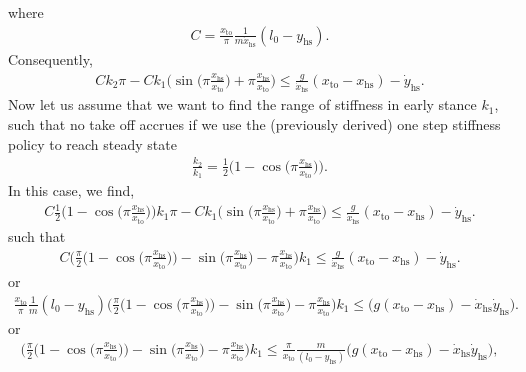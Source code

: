 \documentclass[journal,12pt,onecolumn]{IEEEtran}
\begin{document}
where
\begin{align}
	C =\frac{x_{\text{to}}}{\pi} \frac{1}{m \dot{x}_{\text{hs}}} (l_0-y_\text{hs}).
\end{align}
Consequently,
\begin{align}
	C k_2 \pi - C k_1 \Big( \sin \Big(\pi\frac{x_\text{hs}}{x_\text{to}} \Big) + \pi \frac{x_{\text{hs}}}{x_{\text{to}}} \Big) \leq \frac{g}{\dot{x}_{\text{hs}}} (x_{\text{to}}-x_{\text{hs}}) - \dot{y}_{\text{hs}}.
\end{align}
Now let us assume that we want to find the range of stiffness in early stance $k_1$, such that no take off accrues if we use the (previously derived) one step stiffness policy to reach steady state
\begin{align}
	\frac{k_2}{k_1}= \frac{1}{2} \Big(1-\cos\big(\pi \frac{x_{\text{hs}}}{x_{\text{to}}} \big)\Big).
\end{align}
In this case, we find,
\begin{align}
	C \frac{1}{2} \Big(1-\cos\big(\pi \frac{x_{\text{hs}}}{x_{\text{to}}} \big)\Big) k_1 \pi - C k_1 \Big( \sin \Big(\pi\frac{x_\text{hs}}{x_\text{to}} \Big) + \pi \frac{x_{\text{hs}}}{x_{\text{to}}} \Big) \leq \frac{g}{\dot{x}_{\text{hs}}} (x_{\text{to}}-x_{\text{hs}}) - \dot{y}_{\text{hs}}.
\end{align}
such that
\begin{align}
	C \Bigg(\frac{\pi}{2} \Big(1-\cos\Big(\pi \frac{x_{\text{hs}}}{x_{\text{to}}} \Big)\Big)  -  \sin \Big(\pi\frac{x_\text{hs}}{x_\text{to}} \Big) - \pi \frac{x_{\text{hs}}}{x_{\text{to}}} \Bigg) k_1 \leq \frac{g}{\dot{x}_{\text{hs}}} (x_{\text{to}}-x_{\text{hs}}) - \dot{y}_{\text{hs}}.
\end{align}
or
\begin{align}
	\frac{x_{\text{to}}}{\pi} \frac{1}{m} (l_0-y_\text{hs}) \Bigg(\frac{\pi}{2} \Big(1-\cos\Big(\pi \frac{x_{\text{hs}}}{x_{\text{to}}} \Big)\Big)  -  \sin \Big(\pi\frac{x_\text{hs}}{x_\text{to}} \Big) - \pi \frac{x_{\text{hs}}}{x_{\text{to}}} \Bigg) k_1 \leq \Big( g (x_{\text{to}}-x_{\text{hs}}) - \dot{x}_{\text{hs}}\dot{y}_{\text{hs}}\Big) .
\end{align} 
or
\begin{align}
	\Bigg(\frac{\pi}{2} \Big(1-\cos\Big(\pi \frac{x_{\text{hs}}}{x_{\text{to}}} \Big)\Big)  -  \sin \Big(\pi\frac{x_\text{hs}}{x_\text{to}} \Big) - \pi \frac{x_{\text{hs}}}{x_{\text{to}}} \Bigg) k_1 \leq 
	\frac{\pi}{x_{\text{to}}} \frac{m}{(l_0-y_\text{hs})}  \Big( g (x_{\text{to}}-x_{\text{hs}}) - \dot{x}_{\text{hs}}\dot{y}_{\text{hs}}\Big),
\end{align} 
\end{document}
